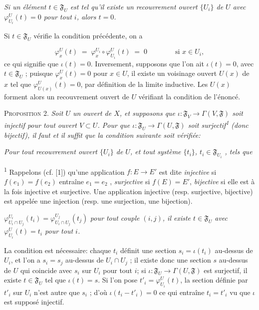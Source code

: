 \textit{Si un élément $t \in \mathfrak{F}_U$ est tel qu'il existe un recouvrement ouvert $\{U_i\}$ de $U$ avec $\varphi_{U_i}^U(t) = 0$ pour tout $i$, alors $t = 0$.}

Si $t \in \mathfrak{F}_U$ vérifie la condition précédente, on a

\begin{equation*}
\varphi_x^U(t) \;=\; \varphi_x^{U_i} \circ \varphi_{U_i}^U(t) \;=\; 0 \qquad\qquad \text{si } x \in U_i,
\end{equation*}
ce qui signifie que $\iota(t) = 0$. Inversement, supposons que l'on ait $\iota(t) = 0$, avec $t \in \mathfrak{F}_U$ ; puisque $\varphi_x^U(t) = 0$ pour $x \in U$, il existe un voisinage ouvert $U(x)$ de $x$ tel que $\varphi_{U(x)}^U(t) = 0$, par définition de la limite inductive. Les $U(x)$ forment alors un recouvrement ouvert de $U$ vérifiant la condition de l'énoncé.

\textsc{Proposition} 2. \textit{Soit $U$ un ouvert de $X$, et supposons que $\iota: \mathfrak{F}_V \to \Gamma(V, \mathfrak{F})$ soit injectif pour tout ouvert $V \subset U$. Pour que $\iota: \mathfrak{F}_U \to \Gamma(U, \mathfrak{F})$ soit surjectif\textsuperscript{1} (donc bijectif), il faut et il suffit que la condition suivante soit vérifiée:}

\textit{Pour tout recouvrement ouvert $\{U_i\}$ de $U$, et tout système $\{t_i\}$, $t_i \in \mathfrak{F}_{U_i}$ , tels que}

\textsuperscript{1} Rappelons (cf. [1]) qu'une application $f: E \to E'$ est dite \textit{injective} si $f(e_1) = f(e_2)$ entraîne $e_1 = e_2$ , \textit{surjective} si $f(E) = E'$, \textit{bijective} si elle est à la fois injective et surjective. Une application injective (resp. surjective, bijective) est appelée une injection (resp. une surjection, une bijection).



 $\varphi^{U_i}_{U_i \cap U_j}(t_i) = \varphi^{U_j}_{U_i \cap U_j}(t_j)$ \textit{pour tout couple $(i, j)$, il existe $t \in \mathfrak{F}_U$ avec $\varphi^{U}_{U_i}(t) = t_i$ pour tout $i$.}

La condition est nécessaire: chaque $t_i$ définit une section $s_i = \iota(t_i)$ au-dessus de $U_i$, et l'on a $s_i = s_j$ au-dessus de $U_i \cap U_j$ ; il existe donc une section $s$ au-dessus de $U$ qui coincide avec $s_i$ sur $U_i$ pour tout $i$; si $\iota : \mathfrak{F}_U \to \Gamma(U, \mathfrak{F})$ est surjectif, il existe $t \in \mathfrak{F}_U$ tel que $\iota(t) = s$. Si l'on pose $t'_i = \varphi^{U}_{U_i}(t)$, la section définie par $t'_i$ sur $U_i$ n'est autre que $s_i$ ; d'où $\iota(t_i - t'_i) = 0$ ce qui entraîne $t_i = t'_i$ vu que $\iota$ est supposé injectif.


